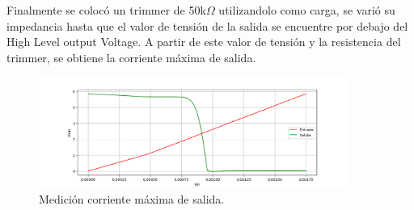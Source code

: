 Finalmente se colocó un trimmer de 50k$\Omega$ utilizandolo como  carga, se varió su impedancia hasta que el valor de tensión de la salida se encuentre por debajo del High Level output Voltage. A partir de este valor de tensión y la resistencia del trimmer, se obtiene la corriente máxima de salida.
\begin{figure}[H]	
	\centering
	\includegraphics[width=0.9\textwidth]{Imagenes/DC-SWEEP/OutputCurrent.PNG}
	\caption{Medición corriente máxima de salida.}
	\label{fig:OutputCurrent}
\end{figure}

